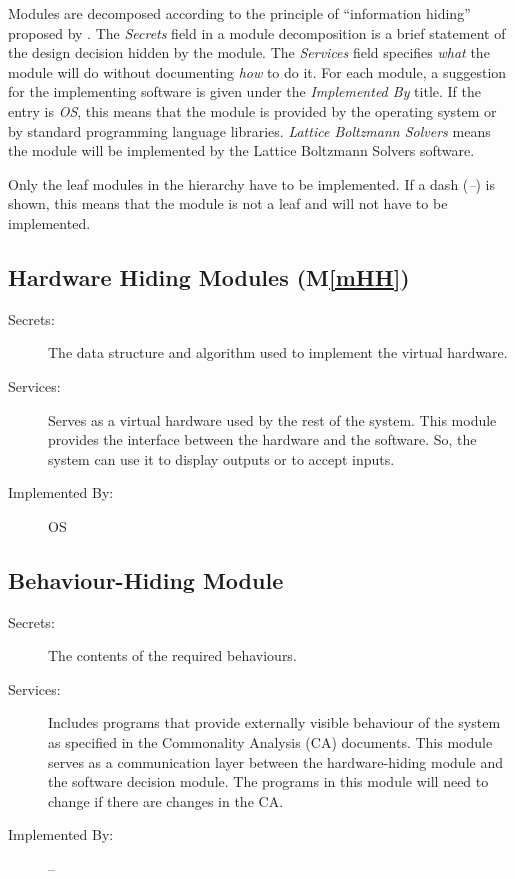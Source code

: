 \documentclass[12pt, titlepage]{article}
\newcommand{\mref}[1]{M\ref{#1}}
\newcommand{\famname}{Lattice Boltzmann Solvers} %
\begin{document}
Modules are decomposed according to the principle of ``information hiding''
proposed by \citet{ParnasEtAl1984}. The \emph{Secrets} field in a module
decomposition is a brief statement of the design decision hidden by the
module. The \emph{Services} field specifies \emph{what} the module will do
without documenting \emph{how} to do it. For each module, a suggestion for the
implementing software is given under the \emph{Implemented By} title. If the
entry is \emph{OS}, this means that the module is provided by the operating
system or by standard programming language libraries.  \emph{\famname{}} means the
module will be implemented by the \famname{} software.

Only the leaf modules in the hierarchy have to be implemented. If a dash
(\emph{--}) is shown, this means that the module is not a leaf and will not have
to be implemented.

\subsection{Hardware Hiding Modules (\mref{mHH})}

\begin{description}
\item[Secrets:]The data structure and algorithm used to implement the virtual
  hardware.
\item[Services:]Serves as a virtual hardware used by the rest of the
  system. This module provides the interface between the hardware and the
  software. So, the system can use it to display outputs or to accept inputs.
\item[Implemented By:] OS
\end{description}

\subsection{Behaviour-Hiding Module}

\begin{description}
\item[Secrets:]The contents of the required behaviours.
\item[Services:]Includes programs that provide externally visible behaviour of
  the system as specified in the Commonality Analysis (CA)
  documents. This module serves as a communication layer between the
  hardware-hiding module and the software decision module. The programs in this
  module will need to change if there are changes in the CA.
\item[Implemented By:] --
\end{description}
\end{document}
